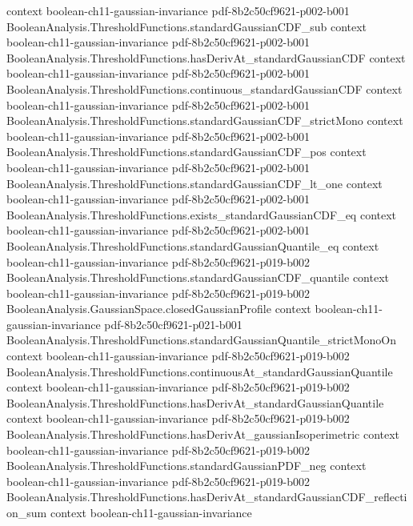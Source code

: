 \begin{lemma}
  {context}
  {boolean-ch11-gaussian-invariance}
  {pdf-8b2c50cf9621-p002-b001}
\proofstep
  {BooleanAnalysis.ThresholdFunctions.standardGaussianCDF_sub}
  {context}
  {boolean-ch11-gaussian-invariance}
  {pdf-8b2c50cf9621-p002-b001}
\proofstep
  {BooleanAnalysis.ThresholdFunctions.hasDerivAt_standardGaussianCDF}
  {context}
  {boolean-ch11-gaussian-invariance}
  {pdf-8b2c50cf9621-p002-b001}
\proofstep
  {BooleanAnalysis.ThresholdFunctions.continuous_standardGaussianCDF}
  {context}
  {boolean-ch11-gaussian-invariance}
  {pdf-8b2c50cf9621-p002-b001}
\proofstep
  {BooleanAnalysis.ThresholdFunctions.standardGaussianCDF_strictMono}
  {context}
  {boolean-ch11-gaussian-invariance}
  {pdf-8b2c50cf9621-p002-b001}
\proofstep
  {BooleanAnalysis.ThresholdFunctions.standardGaussianCDF_pos}
  {context}
  {boolean-ch11-gaussian-invariance}
  {pdf-8b2c50cf9621-p002-b001}
\proofstep
  {BooleanAnalysis.ThresholdFunctions.standardGaussianCDF_lt_one}
  {context}
  {boolean-ch11-gaussian-invariance}
  {pdf-8b2c50cf9621-p002-b001}
\proofstep
  {BooleanAnalysis.ThresholdFunctions.exists_standardGaussianCDF_eq}
  {context}
  {boolean-ch11-gaussian-invariance}
  {pdf-8b2c50cf9621-p002-b001}
\proofstep
  {BooleanAnalysis.ThresholdFunctions.standardGaussianQuantile_eq}
  {context}
  {boolean-ch11-gaussian-invariance}
  {pdf-8b2c50cf9621-p019-b002}
\proofstep
  {BooleanAnalysis.ThresholdFunctions.standardGaussianCDF_quantile}
  {context}
  {boolean-ch11-gaussian-invariance}
  {pdf-8b2c50cf9621-p019-b002}
\proofstep
  {BooleanAnalysis.GaussianSpace.closedGaussianProfile}
  {context}
  {boolean-ch11-gaussian-invariance}
  {pdf-8b2c50cf9621-p021-b001}
\proofstep
  {BooleanAnalysis.ThresholdFunctions.standardGaussianQuantile_strictMonoOn}
  {context}
  {boolean-ch11-gaussian-invariance}
  {pdf-8b2c50cf9621-p019-b002}
\proofstep
  {BooleanAnalysis.ThresholdFunctions.continuousAt_standardGaussianQuantile}
  {context}
  {boolean-ch11-gaussian-invariance}
  {pdf-8b2c50cf9621-p019-b002}
\proofstep
  {BooleanAnalysis.ThresholdFunctions.hasDerivAt_standardGaussianQuantile}
  {context}
  {boolean-ch11-gaussian-invariance}
  {pdf-8b2c50cf9621-p019-b002}
\proofstep
  {BooleanAnalysis.ThresholdFunctions.hasDerivAt_gaussianIsoperimetric}
  {context}
  {boolean-ch11-gaussian-invariance}
  {pdf-8b2c50cf9621-p019-b002}
\proofstep
  {BooleanAnalysis.ThresholdFunctions.standardGaussianPDF_neg}
  {context}
  {boolean-ch11-gaussian-invariance}
  {pdf-8b2c50cf9621-p019-b002}
\proofstep
  {BooleanAnalysis.ThresholdFunctions.hasDerivAt_standardGaussianCDF_reflection_sum}
  {context}
  {boolean-ch11-gaussian-invariance}

\end{lemma}
